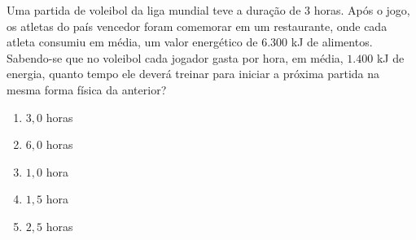 Uma partida de voleibol da liga mundial teve a duração de $3$ horas.
Após o jogo, os atletas do país vencedor foram comemorar em um restaurante, onde cada atleta consumiu em média, um valor energético de $6.300$ kJ de alimentos.
Sabendo-se que no voleibol cada jogador gasta por hora, em média, $1.400$ kJ de energia, quanto tempo ele deverá treinar para iniciar a próxima partida na mesma forma física da anterior?

\begin{enumerate}[label = (\alph*)]
	\item $3,0$ horas		
	\item $6,0$ horas
	\item $1,0$ hora
	\item $1,5$ hora		
	\item $2,5$ horas
\end{enumerate}
